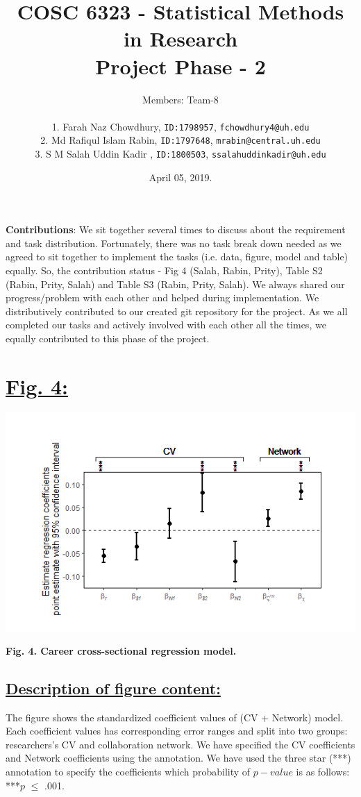 \documentclass{article}\usepackage[]{graphicx}\usepackage[]{color}
\title{COSC 6323 - Statistical Methods in Research\\Project Phase - 2\\}
\author{%
    Members: Team-8 \\\\
    1. Farah Naz Chowdhury,    \texttt{ID:1798957}, \texttt{fchowdhury4@uh.edu}      \vspace{2pt} \\
    2. Md Rafiqul Islam Rabin, \texttt{ID:1797648}, \texttt{mrabin@central.uh.edu}   \vspace{2pt} \\
    3. S M Salah Uddin Kadir , \texttt{ID:1800503}, \texttt{ssalahuddinkadir@uh.edu} \vspace{2pt} \\
}
\date{April 05, 2019.}
\begin{document}
\maketitle
\par{\textbf{Contributions}: We sit together several times to discuss about the requirement and task distribution. Fortunately, there was no task break down needed as we agreed to sit together to implement the tasks (i.e. data, figure, model and table) equally. So, the contribution status - Fig 4 (Salah, Rabin, Prity), Table S2 (Rabin, Prity, Salah) and Table S3 (Rabin, Prity, Salah). We always shared our progress/problem with each other and helped during implementation. We distributively contributed to our created git repository for the project. As we all completed our tasks and actively involved with each other all the times, we equally contributed to this phase of the project.}

\newpage
\section*{\underline{Fig. 4:}}
\begin{center}
\includegraphics[scale=1.0]{Fig4.png}
\newline
\par{\textbf{Fig. 4. Career cross-sectional regression model.}}
\end{center}
\subsection*{\underline{Description of figure content:}}
\par{
The figure shows the standardized coefficient values of (CV + Network) model. Each coefficient values has corresponding error ranges and split into two groups: researchers's CV and collaboration network. We have specified the CV coefficients and Network coefficients using the annotation. We have used the three star (***) annotation to specify the coefficients which probability of $p-value$ is as follows: ***$\textit{p}$ $\leq$ .001.
}
\end{document}
